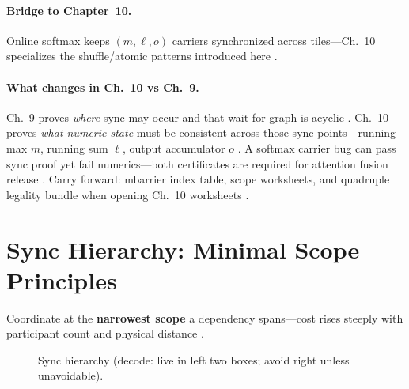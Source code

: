 \paragraph{Bridge to Chapter~10.}
Online softmax keeps $(m,\ell,o)$ carriers synchronized across tiles---Ch.~10 specializes the shuffle/atomic patterns introduced here \citep{dao2022flashattention,shah2024flashattention3,patel2025llminference,memoryfloor2026}.

\paragraph{What changes in Ch.~10 vs Ch.~9.}
Ch.~9 proves \emph{where} sync may occur and that wait-for graph is acyclic \citep{yirage2026,wu2024mirage,shah2024flashattention3}.
Ch.~10 proves \emph{what numeric state} must be consistent across those sync points---running max $m$, running sum $\ell$, output accumulator $o$ \citep{dao2022flashattention,memoryfloor2026}.
A softmax carrier bug can pass sync proof yet fail numerics---both certificates are required for attention fusion release \citep{taxbreak2026,patel2025llminference,chen2020compilerbasedhardw}.
Carry forward: mbarrier index table, scope worksheets, and quadruple legality bundle when opening Ch.~10 worksheets \citep{yirage2026,semianalysis2024tma}.


\section{Sync Hierarchy: Minimal Scope Principles}
\label{sec:ch09_sync_hierarchy}

Coordinate at the \textbf{narrowest scope} a dependency spans---cost rises steeply with participant count and physical distance \citep{shah2024flashattention3,patel2025llminference,nvidia2022hopper}.

\begin{figure}[t]
\centering
{}
\caption{Sync hierarchy (decode: live in left two boxes; avoid right unless unavoidable).}
\label{fig:sync_hierarchy_pipeline}
\end{figure}

